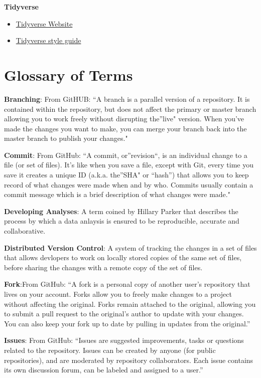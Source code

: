 \documentclass[]{book}
\providecommand{\tightlist}{%
  \setlength{\itemsep}{0pt}\setlength{\parskip}{0pt}}
\begin{document}
\textbf{Tidyverse}

\begin{itemize}
\tightlist
\item
  \href{http://www.tidyverse.org/}{Tidyverse Website}
\item
  \href{http://style.tidyverse.org/}{Tidyverse style guide}
\end{itemize}

\chapter{Glossary of Terms}\label{glossary-of-terms}

\textbf{Branching}: From GitHUB: ``A branch is a parallel version of a
repository. It is contained within the repository, but does not affect
the primary or master branch allowing you to work freely without
disrupting the''live" version. When you've made the changes you want to
make, you can merge your branch back into the master branch to publish
your changes."

\textbf{Commit}: From GitHub: ``A commit, or''revision``, is an
individual change to a file (or set of files). It's like when you save a
file, except with Git, every time you save it creates a unique ID
(a.k.a. the''SHA" or ``hash'') that allows you to keep record of what
changes were made when and by who. Commits usually contain a commit
message which is a brief description of what changes were made."

\textbf{Developing Analyses}: A term coined by Hillary Parker that
describes the process by which a data anlaysis is ensured to be
reproducible, accurate and collaborative.

\textbf{Distributed Version Control}: A system of tracking the changes
in a set of files that allows devlopers to work on locally stored copies
of the same set of files, before sharing the changes with a remote copy
of the set of files.

\textbf{Fork}:From GitHub: ``A fork is a personal copy of another user's
repository that lives on your account. Forks allow you to freely make
changes to a project without affecting the original. Forks remain
attached to the original, allowing you to submit a pull request to the
original's author to update with your changes. You can also keep your
fork up to date by pulling in updates from the original.''

\textbf{Issues}: From GitHub: ``Issues are suggested improvements, tasks
or questions related to the repository. Issues can be created by anyone
(for public repositories), and are moderated by repository
collaborators. Each issue contains its own discussion forum, can be
labeled and assigned to a user.''
\end{document}
